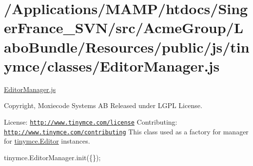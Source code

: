 \hypertarget{_2_applications_2_m_a_m_p_2htdocs_2_singer_france__s_v_n_2src_2_acme_group_2_labo_bundle_2_resou2912fe7da3c2eaf15e0202e73cdcd93d}{\section{/\+Applications/\+M\+A\+M\+P/htdocs/\+Singer\+France\+\_\+\+S\+V\+N/src/\+Acme\+Group/\+Labo\+Bundle/\+Resources/public/js/tinymce/classes/\+Editor\+Manager.\+js}
}
\hyperlink{_editor_manager_8js}{Editor\+Manager.\+js}

Copyright, Moxiecode Systems A\+B Released under L\+G\+P\+L License.

License\+: \href{http://www.tinymce.com/license}{\tt http\+://www.\+tinymce.\+com/license} Contributing\+: \href{http://www.tinymce.com/contributing}{\tt http\+://www.\+tinymce.\+com/contributing} This class used as a factory for manager for \hyperlink{classtinymce_1_1_editor}{tinymce.\+Editor} instances.

tinymce.\+Editor\+Manager.\+init(\{\});


\begin{DoxyCodeInclude}
\end{DoxyCodeInclude}
 